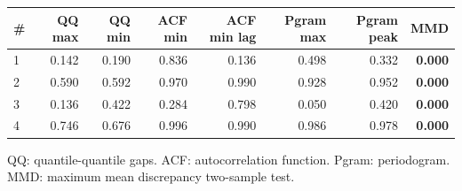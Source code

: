 \documentclass[11pt,a4paper]{article}
\begin{document}
\begin{center}
\begin{tabular}{lrrrrrrr}
\toprule
\# & QQ max & QQ min & ACF min & ACF min lag & Pgram max & Pgram peak & MMD \\
\midrule
1 & 0.142 & 0.190 & 0.836 & 0.136 & 0.498 & 0.332 & \textbf{0.000} \\
2 & 0.590 & 0.592 & 0.970 & 0.990 & 0.928 & 0.952 & \textbf{0.000} \\
3 & 0.136 & 0.422 & 0.284 & 0.798 & 0.050 & 0.420 & \textbf{0.000} \\
4 & 0.746 & 0.676 & 0.996 & 0.990 & 0.986 & 0.978 & \textbf{0.000} \\
\bottomrule
\end{tabular}
\end{center}

QQ: quantile-quantile gaps. ACF: autocorrelation function. Pgram: periodogram. MMD: maximum mean discrepancy two-sample test.
\end{document}
